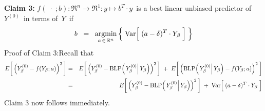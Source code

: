 \begin{enumerate}
	\vskip 0.5cm
	\noindent
	\textbf{Claim 3:}\quad
	$f(\;\cdot\;;b) : \Re^{n} \longrightarrow \Re^{1} : y \longmapsto b^{T} \cdot y$\,
	is a best linear unbiased predictor of \,$Y^{(0)}$\, in terms of \,$Y$\, if
	\begin{equation*}
	b \;\; = \;\;
		\underset{a\,\in\,\Re^{n}}{\textnormal{argmin}}
		\left\{\;
			\Var\!\left[\;(a \overset{{\color{white}.}}{-} \delta)^{T}\cdot Y_{\beta}\;\right]
			\;\right\}
	\end{equation*}
	Proof of Claim 3:\quad Recall that
	\begin{eqnarray*}
	E\!\left[\,\left(Y^{(0)}_{\beta} \overset{{\color{white}.}}{-} f(Y_{\beta};a)\right)^{2}\,\right]
	& = &
		E\!\left[\,
			\left(Y^{(0)}_{\beta}
			\overset{{\color{white}.}}{-}
			\blp\!\left(\left.Y^{(0)}_{\beta}\right\vert Y_{\beta}\right)\right)^{2}
			\,\right]
		\; + \;
		E\!\left[\,
			\left(\blp\!\left(\left.Y^{(0)}_{\beta}\right\vert Y_{\beta}\right)
			\overset{{\color{white}.}}{-}
			f(Y_{\beta};a)\right)^{2}
			\,\right]
	\\
	& = &
		E\!\left[\,
			\left(Y^{(0)}_{\beta}
			\overset{{\color{white}.}}{-}
			\blp\!\left(\left.Y^{(0)}_{\beta}\right\vert Y_{\beta}\right)\right)^{2}
			\,\right]
		\; + \;
		\Var\!\left[\;(a \overset{{\color{white}.}}{-} \delta)^{T}\cdot Y_{\beta}\;\right]
	\end{eqnarray*}
	Claim 3 now follows immediately.

\end{enumerate}



